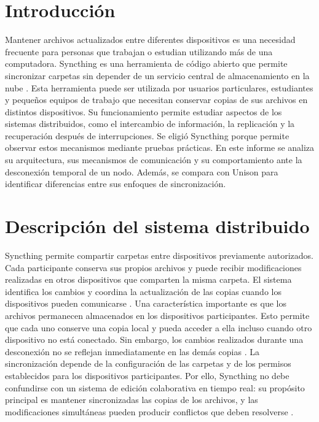 \documentclass[12pt,a4paper]{article}
\begin{document}
\newpage
\section{Introducción}

Mantener archivos actualizados entre diferentes dispositivos es una necesidad frecuente para personas que trabajan o estudian utilizando más de una computadora. 
Syncthing es una herramienta de código abierto que permite sincronizar carpetas sin depender de un servicio central de almacenamiento en la nube \cite{syncthingFAQ}.
Esta herramienta puede ser utilizada por usuarios particulares, estudiantes y pequeños equipos de trabajo que necesitan conservar 
copias de sus archivos en distintos dispositivos. Su funcionamiento permite estudiar aspectos de los sistemas distribuidos, como el intercambio de información, la replicación y la recuperación después de interrupciones.
Se eligió Syncthing porque permite observar estos mecanismos mediante pruebas prácticas. En este informe se analiza su arquitectura, sus mecanismos de comunicación 
y su comportamiento ante la desconexión temporal de un nodo. Además, se compara con Unison para identificar diferencias entre sus enfoques de sincronización.

\section{Descripción del sistema distribuido}

Syncthing permite compartir carpetas entre dispositivos previamente autorizados. 
Cada participante conserva sus propios archivos y puede recibir modificaciones realizadas en otros dispositivos que comparten la misma carpeta. El sistema identifica los cambios y coordina la actualización de las copias cuando los dispositivos pueden comunicarse \cite{syncthingFAQ}.
Una característica importante es que los archivos permanecen almacenados en los dispositivos participantes.
Esto permite que cada uno conserve una copia local y pueda acceder a ella incluso cuando otro dispositivo no está conectado. Sin embargo, los cambios realizados durante una desconexión no se reflejan inmediatamente en las demás copias \cite{syncthingFAQ}.
La sincronización depende de la configuración de las carpetas y de los permisos establecidos para los dispositivos participantes. Por ello, Syncthing no debe confundirse con un sistema de 
edición colaborativa en tiempo real: su propósito principal es mantener sincronizadas las copias de los archivos, y las modificaciones simultáneas pueden producir conflictos que deben resolverse \cite{syncthingFAQ}.
\end{document}
